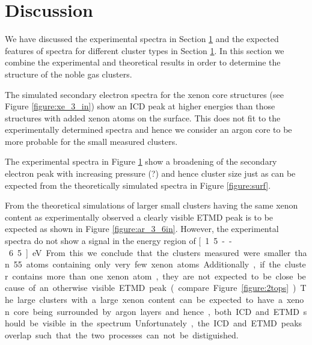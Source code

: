 \section{Discussion}

We have discussed the experimental spectra in Section \ref{} and
the expected features of spectra for different cluster types in
Section \ref{}. In this section we combine the experimental and theoretical
results in order to determine the structure of the noble gas clusters.

The simulated secondary electron spectra for the xenon core structures
(see Figure \ref{figure:xe_3_in})
show an ICD peak at higher energies than those structures with added xenon
atoms on the surface. This does not fit to the experimentally determined
spectra and hence we consider an argon core to be more probable for the
small measured clusters.

The experimental spectra in Figure \ref{}
show a broadening of the secondary electron peak with increasing
pressure (?) and hence cluster size just as can be expected from
the theoretically simulated spectra in Figure \ref{figure:surf}.

From the theoretical simulations of larger small clusters
having the same xenon content as experimentally observed a clearly
visible ETMD peak is to be expected as shown in Figure \ref{figure:ar_3_6in}.
However, the experimental spectra do not show a signal in the energy
region of \unit[1.5--6.5]{eV}. From this we conclude that the clusters
measured were smaller than 55 atoms containing only very few xenon atoms.
Additionally, if the cluster contains more than one xenon atom, they are
not expected to be close because of an otherwise visible ETMD peak
(compare Figure \ref{figure:2tops}).

The large clusters with a large xenon content can be expected to have
a xenon core being surrounded by argon layers and hence, both ICD and
ETMD should be visible in the spectrum. Unfortunately, the ICD and ETMD
peaks overlap such that the two processes can not be distiguished.
